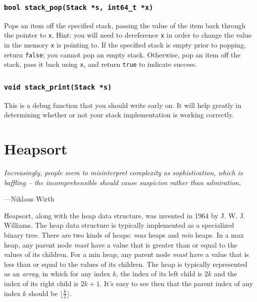 \documentclass[11pt]{article}
\begin{document}
\subsubsection{\texttt{bool stack\_pop(Stack *s, int64\_t *x)}}

Pops an item off the specified stack, passing the value of the item back
through the pointer to \texttt{x}. Hint: you will need to dereference
\texttt{x} in order to change the value in the memory \texttt{x} is
pointing to. If the specified stack is empty prior to popping, return
\texttt{false}; you cannot pop an empty stack. Otherwise, pop an item
off the stack, pass it back using \texttt{x}, and return \texttt{true}
to indicate success.

\subsubsection{\texttt{void stack\_print(Stack *s)}}

This is a debug function that you should write early on. It will help
greatly in determining whether or not your stack implementation is
working correctly.


\section{Heapsort}

\epigraph{\emph{Increasingly, people seem to misinterpret complexity as
sophistication, which is baffling -- the incomprehensible should cause
suspicion rather than admiration.}}{---Niklaus Wirth}

Heapsort, along with the heap data structure, was invented in 1964 by
J. W. J. Williams. The heap data structure is typically implemented as a
specialized binary tree. There are two kinds of heaps: \emph{max} heaps
and \emph{min} heaps. In a max heap, any parent node \emph{must} have a
value that is greater than or equal to the values of its children. For a
min heap, any parent node \emph{must} have a value that is less than or
equal to the values of its children. The heap is typically represented
as an \emph{array}, in which for any index $k$, the index of its left
child is $2k$ and the index of its right child is $2k + 1$. It's easy to
see then that the parent index of any index $k$ should be $\lfloor
\frac{k}{2} \rfloor$.
\end{document}
